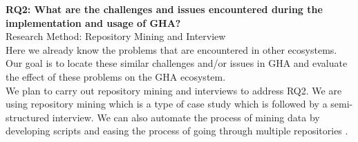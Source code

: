 \documentclass[conference]{IEEEtran}
\begin{document}
\textbf{RQ2: What are the challenges and issues encountered during the implementation and usage of GHA?}\\

Research Method: Repository Mining and Interview\\

	Here we already know the problems that are encountered in other ecosystems. Our goal is to locate these similar challenges and/or issues in GHA and evaluate the effect of these problems on the GHA ecosystem.\\

	We plan to carry out repository mining and interviews to address RQ2. We are using repository mining which is  a type of case study which is followed by a semi-structured interview. We can also automate the process of mining data by developing scripts and easing the process of going through multiple repositories \cite{chaturvedi2013tools}.\\
\end{document}
